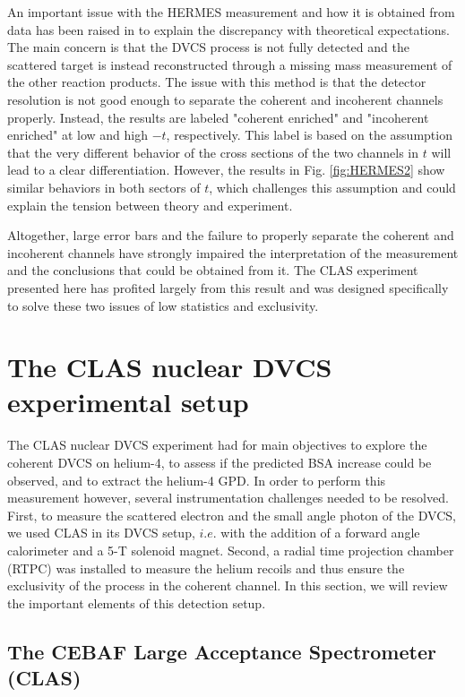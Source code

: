\documentclass{article}
\begin{document}
An important issue with the HERMES measurement and how it is obtained from data has been raised in
\cite{Guzey:2003jh} to explain the discrepancy with theoretical expectations.
The main concern is that the DVCS process is not fully detected and the scattered target
is instead reconstructed through a missing mass measurement of the other reaction products. The 
issue with this method is that the detector resolution is not good enough to separate the 
coherent and incoherent channels properly. 
Instead, the results are labeled "coherent enriched" and "incoherent enriched" at low and high 
$-t$, respectively. This label is based on the assumption that the very different behavior of the
cross sections of the two channels in $t$ will lead to a clear differentiation. However, the
results in Fig. \ref{fig:HERMES2} show similar behaviors in both sectors of $t$, which  
challenges this assumption and could explain the tension between theory and experiment. 

Altogether, large error bars and the failure to properly separate the coherent and 
incoherent channels have strongly impaired the interpretation of the measurement 
and the conclusions that could be
obtained from it. The CLAS experiment presented here has profited largely from this
result and was designed specifically to solve these two issues of low statistics and exclusivity.

\section{The CLAS nuclear DVCS experimental setup}

The CLAS nuclear DVCS experiment had for main objectives to explore the coherent DVCS on helium-4, to assess if
the predicted BSA increase could be observed, and to extract the helium-4 GPD. In order to
perform this measurement however, several instrumentation challenges needed to be resolved. First, to
measure the scattered electron and the small angle photon of the DVCS, we used CLAS in its 
DVCS setup, $i.e.$ with the addition of a forward angle calorimeter and a 5-T solenoid magnet. Second, a
radial time projection chamber (RTPC) was installed to measure the
helium recoils and thus ensure the exclusivity of the process in the coherent channel. In this section, we 
will review the important elements of this detection setup. 

\subsection{The CEBAF Large Acceptance Spectrometer (CLAS)}
\end{document}
